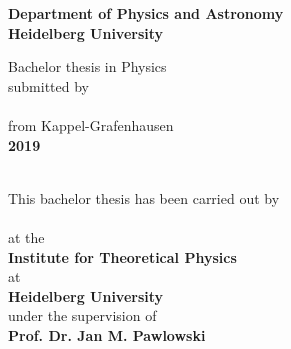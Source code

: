 {\hypersetup{allcolors=black}
\begin{titlepage}

	\begin{center}
		\makeatletter
		\vspace{2cm}
		\Large\textbf{Department of Physics and Astronomy\\
			Heidelberg University}
		
		\vfill
		\normalsize
		Bachelor thesis in Physics\\
		\normalsize
		submitted by\\[0.4cm]
		\Large
		\textbf{\@author}\\[0.4cm]
		\normalsize
		from Kappel-Grafenhausen \\ [0.4cm]
		\Large\textbf{2019}

		\cleardoublepage
		\thispagestyle{empty}
		\LARGE\textbf{\@title}\\[.4cm]

		\vfill
		\normalsize
		This bachelor thesis has been carried out by \\ 
		\vspace{3pt}
		\textbf{\@author}  \\ 
		\vspace{3pt}
		at the\\
		\vspace{3pt}
		\textbf{Institute for Theoretical Physics} \\ at \\\textbf{Heidelberg University}\\
		\vspace{5pt}
		under the supervision of\\
		\vspace{5pt}
		\textbf{Prof. Dr. Jan M. Pawlowski}
		
		\makeatother
	\end{center}
\cleardoublepage
\end{titlepage}}